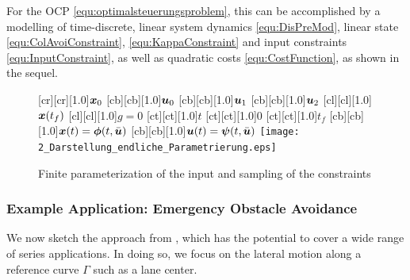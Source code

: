 For the OCP \eqref{equ:optimalsteuerungsproblem}, this can be accomplished by a modelling of time-discrete, linear system dynamics \eqref{equ:DisPreMod}, linear state  \eqref{equ:ColAvoiConstraint},  \eqref{equ:KappaConstraint}  and input constraints  \eqref{equ:InputConstraint}, as well as quadratic costs \eqref{equ:CostFunction}, as shown in the sequel.

\begin{figure}[h]
\centering
	[cr][cr][1.0]{$\boldsymbol{x}_0$}
	[cb][cb][1.0]{$\boldsymbol{u}_0$}
	[cb][cb][1.0]{$\boldsymbol{u}_1$}
	[cb][cb][1.0]{$\boldsymbol{u}_2$}
	[cl][cl][1.0]{$\boldsymbol{x}(t_f)$}
	[cl][cl][1.0]{$g=0$}
	[ct][ct][1.0]{$t$}
	[ct][ct][1.0]{$0$}
	[ct][ct][1.0]{$t_f$}
	[cb][cb][1.0]{$\boldsymbol{x}(t) = \boldsymbol{\phi}(t,\bar{\boldsymbol{u}})$}
	[cb][cb][1.0]{$\boldsymbol{u}(t) = \boldsymbol{\psi}(t,\bar{\boldsymbol{u}})$}
 \texttt{[image: 2\_Darstellung\_endliche\_Parametrierung.eps]}
	\caption[Finite parameterization of the input]{Finite parameterization of the input and sampling of the constraints \cite{papageorgiou2012optimierung}} 
	\label{fig:parametrisierte_nmpc}
\end{figure}


\subsubsection{Example Application: Emergency Obstacle Avoidance}\label{S:57.3.2.2}
We now sketch the approach from \cite{gutjahr2016lateral}, which has the potential to cover a wide range of series applications.
In doing so, we focus on the lateral motion along a reference curve $\Gamma$ such as a lane center. 

